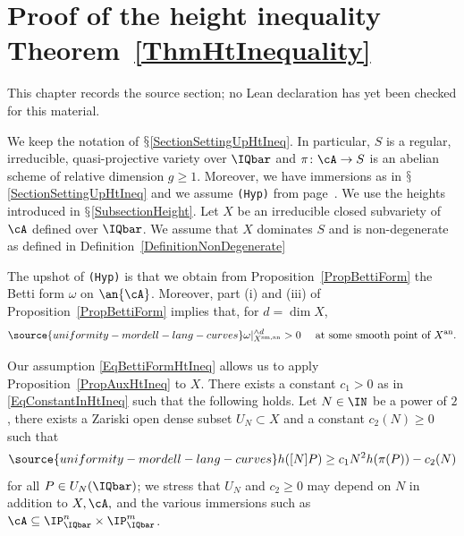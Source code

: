 \chapter{Proof of the height inequality Theorem~\ref{ThmHtInequality}}
\label{uniformity-mordell-lang-curves-chapter-05}

\begin{remark}
\label{uniformity-mordell-lang-curves-chapter-05-source}
This chapter records the source section; no Lean declaration has yet been checked for this material.
\notready
\end{remark}

\label{SectionHtIneq}


We keep the notation of $\mathsection$\ref{SectionSettingUpHtIneq}. In
particular, $S$ is a regular, irreducible, quasi-projective variety over $\IQbar$ and
$\pi\colon\cA\rightarrow S$ is an abelian scheme of relative dimension
$g \ge 1$. Moreover, we have immersions as in
$\mathsection$\ref{SectionSettingUpHtIneq} and we
assume {\tt (Hyp)} from page~\pageref{def:hyp}.
We use the heights introduced in $\mathsection$\ref{SubsectionHeight}.
Let $X$ be an irreducible closed subvariety of $\cA$
defined over $\IQbar$. We assume that $X$ dominates $S$ and is
non-degenerate as defined in Definition~\ref{DefinitionNonDegenerate}

The upshot of {\tt (Hyp)} is that we obtain from Proposition~\ref{PropBettiForm} the Betti form $\omega$ on $\an{\cA}$. Moreover, part (i) and (iii) of Proposition~\ref{PropBettiForm} implies that, for $d = \dim X$,
\begin{equation}\label{EqBettiFormHtIneq}
\source{uniformity-mordell-lang-curves}
\omega|_{X^{\mathrm{sm},\mathrm{an}}}^{\wedge d} > 0 \quad \text{ at some smooth point of }X^{\mathrm{an}}.
\end{equation}


Our assumption \eqref{EqBettiFormHtIneq} allows us to apply
Proposition~\ref{PropAuxHtIneq} to
$X$.
 There exists a constant $c_1>0$ as in \eqref{EqConstantInHtIneq} such
 that the following holds. Let $N\in\IN$ be a power of $2$, there
 exists a Zariski open dense subset $U_N\subset X$ and a constant
 $c_2(N)\ge 0$ such that
\begin{equation}\label{EquationHeight1}
\source{uniformity-mordell-lang-curves}
h([N]P) \ge c_1 N^2 h(\pi(P)) - c_2(N)
\end{equation}
for all $P\in U_N(\IQbar)$; we stress that $U_N$ and
 $c_2\ge 0$ may depend  on $N$ in addition to $X,\cA,$ and the various
 immersions such as $\cA \subseteq \IP_\IQbar^n \times \IP_\IQbar^m$.


